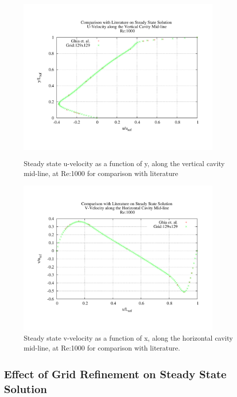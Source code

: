 \begin{figure}[h!]
\center
\includegraphics[width=0.9\textwidth]{plots/lit_u_1000}
\caption{Steady state u-velocity as a function of y, along the vertical cavity mid-line, at Re:1000 for comparison with literature}
\label{fig:lit_u_1000}

\center
\includegraphics[width=0.9\textwidth]{plots/lit_v_1000}
\caption{Steady state v-velocity as a function of x, along the horizontal cavity mid-line, at Re:1000 for comparison with literature.}
\label{fig:lit_v_1000}
\end{figure}


	\subsection{Effect of Grid Refinement on Steady State Solution}

